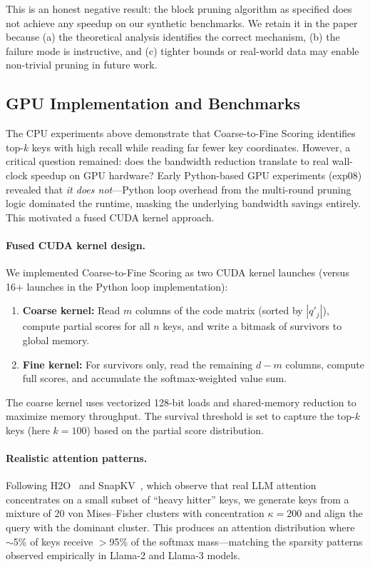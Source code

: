 \documentclass[10pt,twocolumn]{article}
\theoremstyle{definition}
\begin{document}
This is an honest negative result: the block pruning algorithm as specified
does not achieve any speedup on our synthetic benchmarks.  We retain it in the
paper because (a) the theoretical analysis identifies the correct mechanism,
(b) the failure mode is instructive, and (c) tighter bounds or real-world data
may enable non-trivial pruning in future work.


\clearpage
\subsection{GPU Implementation and Benchmarks}
\label{sec:gpu_benchmarks}

The CPU experiments above demonstrate that Coarse-to-Fine Scoring identifies
top-$k$ keys with high recall while reading far fewer key coordinates.  However,
a critical question remained: does the bandwidth reduction translate to real
wall-clock speedup on GPU hardware?  Early Python-based GPU experiments
(exp08) revealed that \emph{it does not}---Python loop overhead from the
multi-round pruning logic dominated the runtime, masking the underlying
bandwidth savings entirely.  This motivated a fused CUDA kernel approach.

\paragraph{Fused CUDA kernel design.}
We implemented Coarse-to-Fine Scoring as two CUDA kernel launches (versus 16+
launches in the Python loop implementation):
\begin{enumerate}[nosep]
  \item \textbf{Coarse kernel:} Read $m$ columns of the code matrix (sorted by
        $|q'_j|$), compute partial scores for all $n$ keys, and write a bitmask
        of survivors to global memory.
  \item \textbf{Fine kernel:} For survivors only, read the remaining $d - m$
        columns, compute full scores, and accumulate the softmax-weighted value
        sum.
\end{enumerate}
The coarse kernel uses vectorized 128-bit loads and shared-memory reduction to
maximize memory throughput.  The survival threshold is set to capture the top-$k$
keys (here $k = 100$) based on the partial score distribution.

\paragraph{Realistic attention patterns.}
Following H2O~\cite{zhang2023h2o} and SnapKV~\cite{li2024snapkv}, which observe
that real LLM attention concentrates on a small subset of ``heavy hitter'' keys,
we generate keys from a mixture of 20 von Mises--Fisher clusters with
concentration $\kappa = 200$ and align the query with the dominant cluster.  This
produces an attention distribution where $\sim$5\% of keys receive $>$95\% of
the softmax mass---matching the sparsity patterns observed empirically in Llama-2
and Llama-3 models.
\end{document}
